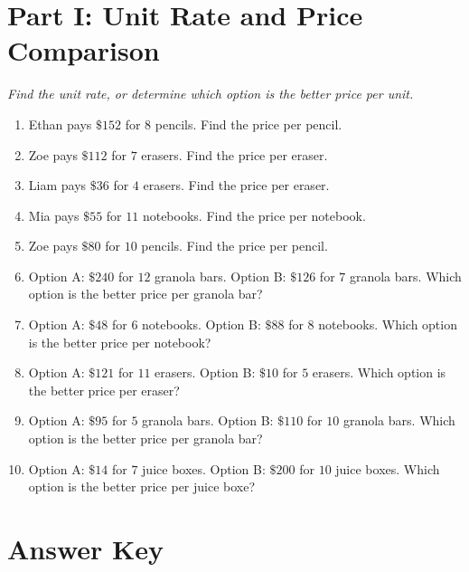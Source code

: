 \documentclass[11pt]{article}
\begin{document}
\section*{Part I: Unit Rate and Price Comparison}
\noindent\textit{Find the unit rate, or determine which option is the better price per unit.}
\begin{enumerate}
  \item Ethan pays $\$152$ for $8$ pencils. Find the price per pencil.
  \vspace{2.0cm}
  \item Zoe pays $\$112$ for $7$ erasers. Find the price per eraser.
  \vspace{2.0cm}
  \item Liam pays $\$36$ for $4$ erasers. Find the price per eraser.
  \vspace{2.0cm}
  \item Mia pays $\$55$ for $11$ notebooks. Find the price per notebook.
  \vspace{2.0cm}
  \item Zoe pays $\$80$ for $10$ pencils. Find the price per pencil.
  \vspace{2.0cm}
  \item Option A: $\$240$ for $12$ granola bars. Option B: $\$126$ for $7$ granola bars. Which option is the better price per granola bar?
  \vspace{2.0cm}
  \item Option A: $\$48$ for $6$ notebooks. Option B: $\$88$ for $8$ notebooks. Which option is the better price per notebook?
  \vspace{2.0cm}
  \item Option A: $\$121$ for $11$ erasers. Option B: $\$10$ for $5$ erasers. Which option is the better price per eraser?
  \vspace{2.0cm}
  \item Option A: $\$95$ for $5$ granola bars. Option B: $\$110$ for $10$ granola bars. Which option is the better price per granola bar?
  \vspace{2.0cm}
  \item Option A: $\$14$ for $7$ juice boxes. Option B: $\$200$ for $10$ juice boxes. Which option is the better price per juice boxe?
  \vspace{2.0cm}
\end{enumerate}

\newpage
{}
\section*{Answer Key}
\end{document}
